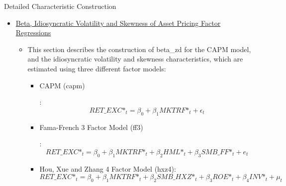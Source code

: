 \documentclass[12pt,title,fleqn]{article}
\begin{document}
\begin{section}{Detailed Characteristic Construction}
\begin{itemize}
\begin{itemize}
                \item A rolling regression of the following form is run for each company, with the time series split up into n groups:  
                        \begin{equation*} 
                            \_ni\_at_{t} = \beta_0 + \beta_1\_ni\_at_{t - 12} + u_t 
                        \end{equation*}
                        where $edf_{t}$ = the error degrees of freedom of regression and $rmse_{t}$ = root mean square error of the regression.
                    
                \item Characteristic:
                    \begin{equation*}
                        ni\_ivol_t = \sqrt{\frac{rmse_t^2 \times edf_t}{edf_t + 1}}
                    \end{equation*}
            \end{itemize}
            
        \item \hyperlink{factors2}{\hypertarget{factors}{Beta, Idiosyncratic Volatility and Skewness of Asset Pricing Factor Regressions}}
            \begin{itemize}
                \item This section describes the construction of beta\_zd for the CAPM model, and the idiosyncratic volatility and skewness characteristics, which are estimated using three different factor models:
                    \begin{itemize}
                        \item \hypertarget{ep_capm}{CAPM (capm)}:
                        \begin{equation*}
                            RET\_EXC\mbox{*}_t = \beta_0 + \beta_1 MKTRF\mbox{*}_t + \epsilon_t
                        \end{equation*}
                        
                        \item \hypertarget{e_ff3}{Fama-French 3 Factor Model (ff3)}:
                        \begin{equation*}
                            RET\_EXC\mbox{*}_t = \beta_0 + \beta_1 MKTRF\mbox{*}_t + \beta_2 HML\mbox{*}_t + \beta_3 SMB\_FF\mbox{*}_t + e_t
                        \end{equation*}
                        
                        \item Hou, Xue and Zhang 4 Factor Model (hxz4):
                        \begin{equation*}
                            RET\_EXC\mbox{*}_t = \beta_0 + \beta_1 MKTRF\mbox{*}_t + \beta_2 SMB\_HXZ\mbox{*}_t + \beta_3 ROE\mbox{*}_t + \beta_4 INV\mbox{*}_t + \mu_t
                        \end{equation*}
                    \end{itemize}


\end{itemize}
\end{itemize}
\end{section}
\end{document}
